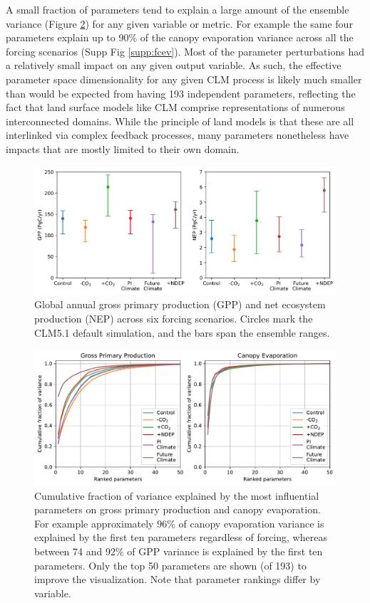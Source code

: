 \documentclass[draft]{agujournal2019}
\begin{document}
A small fraction of parameters tend to explain a large amount of the ensemble variance (Figure \ref{fig:variance}) for any given variable or metric. For example the same four parameters explain up to 90\% of the canopy evaporation variance across all the forcing scenarios (Supp Fig \ref{supp:fcev}). Most of the parameter perturbations had a relatively small impact on any given output variable. As such, the effective parameter space dimensionality for any given CLM process is likely much smaller than would be expected from having 193 independent parameters, reflecting the fact that land surface models like CLM comprise representations of numerous interconnected domains. While the principle of land models is that these are all interlinked via complex feedback processes, many parameters nonetheless have impacts that are mostly limited to their own domain. 

\begin{figure}[h]
\centering
\includegraphics[width=\textwidth]{../figs/ranges.png}
\caption{Global annual gross primary production (GPP) and net ecosystem production (NEP) across six forcing scenarios. Circles mark the CLM5.1 default simulation, and the bars span the ensemble ranges.}
\label{fig:ranges}
\end{figure}

\begin{figure}[h]
\centering
\includegraphics[width=\textwidth]{../figs/variance.pdf}
\caption{Cumulative fraction of variance explained by the most influential parameters on gross primary production and canopy evaporation. For example approximately 96\% of canopy evaporation variance is explained by the first ten parameters regardless of forcing, whereas between 74 and 92\% of GPP variance is explained by the first ten parameters. Only the top 50 parameters are shown (of 193) to improve the visualization. Note that parameter rankings differ by variable.}
\label{fig:variance}
\end{figure}
\end{document}

